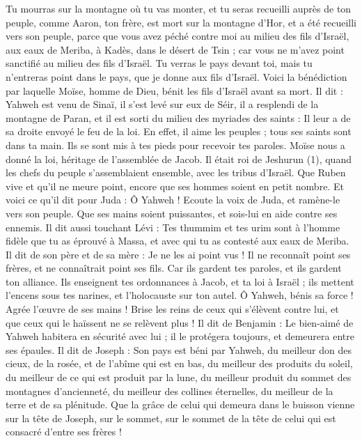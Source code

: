 \begin{multicols}{2}
Tu mourras sur la montagne où tu vas monter, et tu seras recueilli auprès de ton peuple, comme Aaron, ton frère, est mort sur la montagne d'Hor, et a été recueilli vers son peuple,
parce que vous avez péché contre moi au milieu des fils d'Israël, aux eaux de Meriba, à Kadès, dans le désert de Tsin ; car vous ne m'avez point sanctifié au milieu des fils d'Israël.
Tu verras le pays devant toi, mais tu n’entreras point dans le pays, que je donne aux fils d'Israël.
\VerseOne{}Voici la bénédiction par laquelle Moïse, homme de Dieu, bénit les fils d'Israël avant sa mort.
Il dit : Yahweh est venu de Sinaï, il s'est levé sur eux de Séir, il a resplendi de la montagne de Paran, et il est sorti du milieu des myriades des saints : Il leur a de sa droite envoyé le feu de la loi.
En effet, il aime les peuples ; tous ses saints sont dans ta main. Ils se sont mis à tes pieds pour recevoir tes paroles.
Moïse nous a donné la loi, héritage de l'assemblée de Jacob.
Il était roi de Jeshurun (1), quand les chefs du peuple s’assemblaient ensemble, avec les tribus d'Israël.
Que Ruben vive et qu'il ne meure point, encore que ses hommes soient en petit nombre.
Et voici ce qu’il dit pour Juda : Ô Yahweh ! Ecoute la voix de Juda, et ramène-le vers son peuple. Que ses mains soient puissantes, et sois-lui en aide contre ses ennemis.
Il dit aussi touchant Lévi : Tes thummim et tes urim sont à l'homme fidèle que tu as éprouvé à Massa, et avec qui tu as contesté aux eaux de Meriba.
Il dit de son père et de sa mère : Je ne les ai point vus ! Il ne reconnaît point ses frères, et ne connaîtrait point ses fils. Car ils gardent tes paroles, et ils gardent ton alliance.
Ils enseignent tes ordonnances à Jacob, et ta loi à Israël ; ils mettent l’encens sous tes narines, et l’holocauste sur ton autel.
Ô Yahweh, bénis sa force ! Agrée l'œuvre de ses mains ! Brise les reins de ceux qui s'élèvent contre lui, et que ceux qui le haïssent ne se relèvent plus !
Il dit de Benjamin : Le bien-aimé de Yahweh habitera en sécurité avec lui ; il le protégera toujours, et demeurera entre ses épaules.
Il dit de Joseph : Son pays est béni par Yahweh, du meilleur don des cieux, de la rosée, et de l'abîme qui est en bas,
du meilleur des produits du soleil, du meilleur de ce qui est produit par la lune,
du meilleur produit du sommet des montagnes d’ancienneté, du meilleur des collines éternelles,
du meilleur de la terre et de sa plénitude. Que la grâce de celui qui demeura dans le buisson vienne sur la tête de Joseph, sur le sommet, sur le sommet de la tête de celui qui est consacré d'entre ses frères !

\end{multicols}
